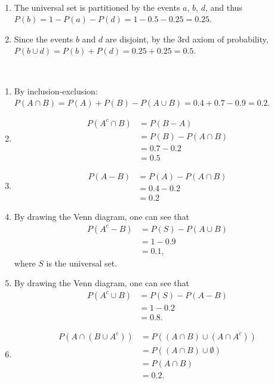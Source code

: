 \begin{problem}{13} $ $
	\begin{enumerate}
		
		\item The universal set is partitioned by the events $a$, $b$, $d$, and thus $P(b) = 1 - P(a) - P(d) = 1-0.5-0.25=0.25$.
		
		\item Since the events $b$ and $d$ are disjoint, by the 3rd axiom of probability, $P(b \cup d) = P(b)+P(d) = 0.25+0.25 = 0.5 $.
	
  
 	\end{enumerate}
\end{problem} 


\begin{problem}{14} $ $
	\begin{enumerate}
		
		\item By inclusion-exclusion: $P(A \cap B) = P(A)+P(B)-P(A \cup B) = 0.4+0.7-0.9 = 0.2$.
		
		\item 
			\begin{align*}
				P(A^c \cap B) &= P(B-A) \\
				& = P(B) - P(A\cap B) \\
				& = 0.7-0.2 \\
				&=0.5
			\end{align*}
			
		\item 
			\begin{align*}
				P(A-B) & = P(A) - P(A\cap B) \\
				& = 0.4-0.2 \\
				&=0.2
			\end{align*}
			
		\item  By drawing the Venn diagram, one can see that
			\begin{align*}
				P(A^c-B) & = P(S) - P(A\cup B) \\
				& = 1 - 0.9 \\
				&=0.1,
			\end{align*}
		where $S$ is the universal set.
		
		
		\item  By drawing the Venn diagram, one can see that
			\begin{align*}
				P(A^c \cup B) & = P(S) - P(A- B) \\
				& = 1 - 0.2 \\
				&=0.8.
			\end{align*}

		\item  
			\begin{align*}
				P(A \cap (B \cup A^c)) &=  P((A \cap B)\cup(A \cap A^c) )\\
				& = P((A \cap B) \cup \emptyset)\\
				&= P(A \cap B) \\
				& = 0.2.
			\end{align*}
  
 	\end{enumerate}
\end{problem} 



